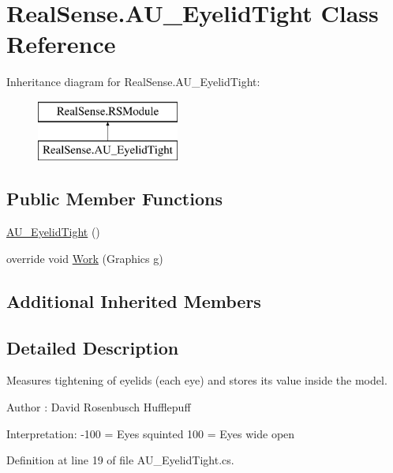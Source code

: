 \hypertarget{class_real_sense_1_1_a_u___eyelid_tight}{}\section{Real\+Sense.\+A\+U\+\_\+\+Eyelid\+Tight Class Reference}
\label{class_real_sense_1_1_a_u___eyelid_tight}
Inheritance diagram for Real\+Sense.\+A\+U\+\_\+\+Eyelid\+Tight\+:\begin{figure}[H]
\begin{center}
\leavevmode
\includegraphics[height=2.000000cm]{class_real_sense_1_1_a_u___eyelid_tight}
\end{center}
\end{figure}
\subsection*{Public Member Functions}
\begin{DoxyCompactItemize}
\item 
\hyperlink{class_real_sense_1_1_a_u___eyelid_tight_a43f0e6e9a4e0862ae2044be31855df0b}{A\+U\+\_\+\+Eyelid\+Tight} ()
\item 
override void \hyperlink{class_real_sense_1_1_a_u___eyelid_tight_a778e09bf84946d959dcf3375a3c8d662}{Work} (Graphics g)
\end{DoxyCompactItemize}
\subsection*{Additional Inherited Members}


\subsection{Detailed Description}
Measures tightening of eyelids (each eye) and stores its\textquotesingle{} value inside the model. \begin{DoxyAuthor}{Author}
\+: David Rosenbusch  Hufflepuff
\end{DoxyAuthor}
Interpretation\+: -\/100 = Eyes squinted 100 = Eyes wide open 

Definition at line 19 of file A\+U\+\_\+\+Eyelid\+Tight.\+cs.



